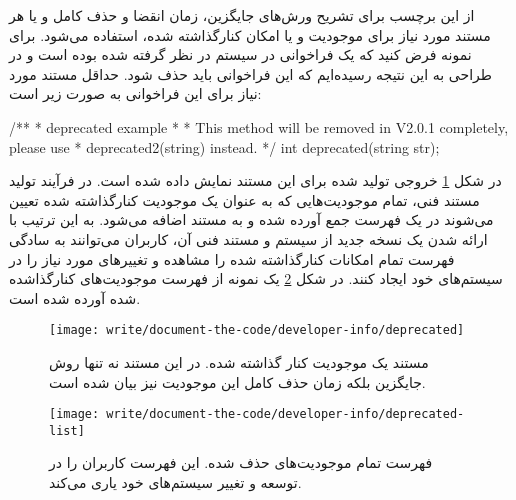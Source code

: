 از این برچسب برای تشریح ورش‌های جایگزین، زمان انقضا و حذف کامل و یا هر مستند
مورد نیاز برای موجودیت و یا امکان کنارگذاشته شده، استفاده می‌شود.
برای نمونه فرض کنید که یک فراخوانی در سیستم در نظر گرفته شده بوده است و در
طراحی به این نتیجه رسیده‌ایم که این فراخوانی باید حذف شود.
حداقل مستند مورد نیاز برای این فراخوانی به صورت زیر است:
\begin{C++}
/**
 * \brief deprecated example
 *
 * \deprecated This method will be removed in V2.0.1 completely, please use
 * deprecated2(string) instead.
 */
int deprecated(string str);
\end{C++}

در شکل \ref{write/document-the-code/developer-info/deprecated} خروجی تولید شده
برای این مستند نمایش داده شده است.
در فرآیند تولید مستند فنی، تمام موجودیت‌هایی که به عنوان یک موجودیت کنارگذاشته
شده تعیین می‌شوند در یک فهرست جمع آورده شده و به مستند اضافه می‌شود.
به این ترتیب با ارائه شدن یک نسخه جدید از سیستم و مستند فنی آن، کاربران
می‌توانند به سادگی فهرست تمام امکانات کنارگذاشته شده را مشاهده و تغییرهای مورد
نیاز را در سیستم‌های خود ایجاد کنند.
در شکل \ref{write/document-the-code/developer-info/deprecated-list} یک نمونه از
فهرست موجودیت‌های کنارگذاشده شده آورده شده است.
\begin{figure}
	\centering
	\texttt{[image: write/document-the-code/developer-info/deprecated]}
	\caption[موجودیت کنار گذاشته شده]{
		مستند یک موجودیت کنار گذاشته شده. در این مستند نه تنها روش جایگزین بلکه زمان
		حذف کامل این موجودیت نیز بیان شده است.
	}
	\label{write/document-the-code/developer-info/deprecated}
\end{figure}
\begin{figure}
	\centering
	\texttt{[image: write/document-the-code/developer-info/deprecated-list]}
	\caption[فهرست موجودیت‌های کنار گذاشته شده]{
		فهرست تمام موجودیت‌های حذف شده. این فهرست کاربران را در توسعه و تغییر سیستم‌های خود
		یاری می‌کند.
	}
	\label{write/document-the-code/developer-info/deprecated-list}
\end{figure}


% 

